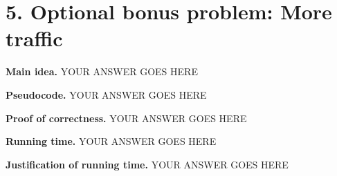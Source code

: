 \documentclass[11pt]{article}
\begin{document}
\newpage
\section*{5. Optional bonus problem: More traffic}
\noindent
\textbf{Main idea.}
YOUR ANSWER GOES HERE


\noindent
\textbf{Pseudocode.}
YOUR ANSWER GOES HERE


\noindent
\textbf{Proof of correctness.}
YOUR ANSWER GOES HERE


\noindent
\textbf{Running time.}
YOUR ANSWER GOES HERE


\noindent
\textbf{Justification of running time.}
YOUR ANSWER GOES HERE
\end{document}
